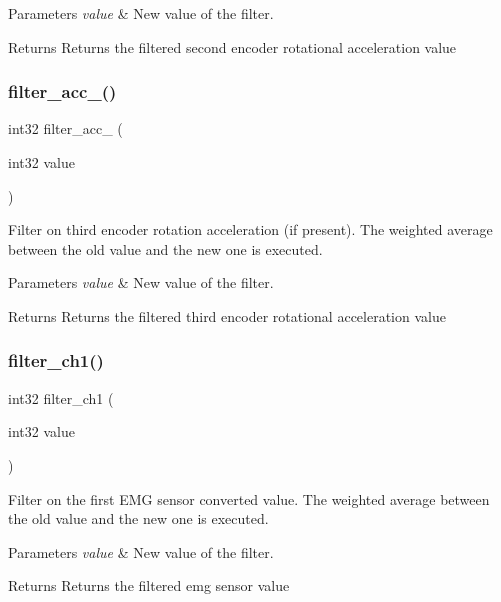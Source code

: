 \begin{DoxyParams}{Parameters}
{\em value} & New value of the filter.\\
\hline
\end{DoxyParams}
\begin{DoxyReturn}{Returns}
Returns the filtered second encoder rotational acceleration value 
\end{DoxyReturn}
\mbox{\label{utils_8h_a5124047254c64be63f96ae68d2e28149}} 
\subsubsection{filter\+\_\+acc\+\_()}
{\footnotesize\ttfamily int32 filter\+\_\+acc\+\_ (\begin{DoxyParamCaption}\item[{int32}]{value }\end{DoxyParamCaption})}

Filter on third encoder rotation acceleration (if present). The weighted average between the old value and the new one is executed.


\begin{DoxyParams}{Parameters}
{\em value} & New value of the filter.\\
\hline
\end{DoxyParams}
\begin{DoxyReturn}{Returns}
Returns the filtered third encoder rotational acceleration value 
\end{DoxyReturn}
\mbox{\label{utils_8h_ae143e439a41178d1cf10da4920488f86}} 
\subsubsection{filter\+\_\+ch1()}
{\footnotesize\ttfamily int32 filter\+\_\+ch1 (\begin{DoxyParamCaption}\item[{int32}]{value }\end{DoxyParamCaption})}

Filter on the first E\+MG sensor converted value. The weighted average between the old value and the new one is executed.


\begin{DoxyParams}{Parameters}
{\em value} & New value of the filter.\\
\hline
\end{DoxyParams}
\begin{DoxyReturn}{Returns}
Returns the filtered emg sensor value 
\end{DoxyReturn}
\mbox{\label{utils_8h_a45f7702bcbea56e0d255f6a615e6b8ae}} 
